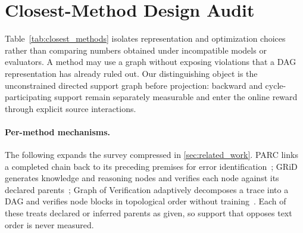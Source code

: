 \section{Closest-Method Design Audit}
\label{app:closest_methods}

Table~\ref{tab:closest_methods} isolates representation and optimization choices rather than
comparing numbers obtained under incompatible models or evaluators. A method may use a graph
without exposing violations that a DAG representation has already ruled out. Our distinguishing
object is the unconstrained directed support graph before projection: backward and
cycle-participating support remain separately measurable and enter the online reward through
explicit source interactions.

\paragraph{Per-method mechanisms.}
The following expands the survey compressed in \cref{sec:related_work}. PARC links a completed
chain back to its preceding premises for error identification~\citep{mukherjee2025parc}; GRiD
generates knowledge and reasoning nodes and verifies each node against its declared
parents~\citep{wen2025grid}; Graph of Verification adaptively decomposes a trace into a DAG and
verifies node blocks in topological order without training~\citep{fang2026gov}. Each of these
treats declared or inferred parents as given, so support that opposes text order is never
measured.

